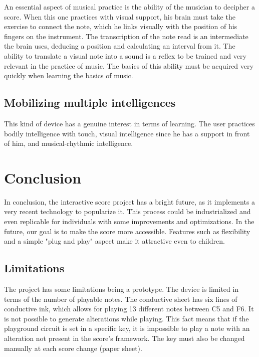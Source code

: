 An essential aspect of musical practice is the ability of the musician to decipher a score. When this one practices with visual support, his brain must take the exercise to connect the note, which he links visually with the position of his fingers on the instrument. The transcription of the note read is an intermediate the brain uses, deducing a position and calculating an interval from it. The ability to translate a visual note into a sound is a reflex to be trained and very relevant in the practice of music. The basics of this ability must be acquired very quickly when learning the basics of music.

\subsection{Mobilizing multiple intelligences}

This kind of device has a genuine interest in terms of learning. The user practices bodily intelligence with touch, visual intelligence since he has a support in front of him, and musical-rhythmic intelligence.

\section{Conclusion}

In conclusion, the interactive score project has a bright future, as it implements a very recent technology to popularize it. This process could be industrialized and even replicable for individuals with some improvements and optimizations. In the future, our goal is to make the score more accessible. Features such as flexibility and a simple "plug and play" aspect make it attractive even to children.

\subsection{Limitations}

The project has some limitations being a prototype. The device is limited in terms of the number of playable notes. The conductive sheet has six lines of conductive ink, which allows for playing 13 different notes between C5 and F6. It is not possible to generate alterations while playing. This fact means that if the playground circuit is set in a specific key, it is impossible to play a note with an alteration not present in the score's framework. The key must also be changed manually at each score change (paper sheet).


